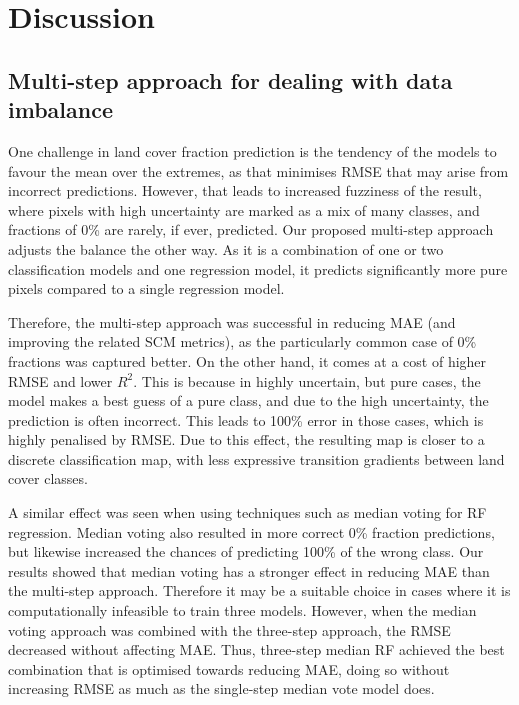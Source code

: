 \documentclass[review,authoryear,3p]{elsarticle}
\begin{document}
\section{Discussion}

\subsection{Multi-step approach for dealing with data imbalance}

One challenge in land cover fraction prediction is the tendency of the models to favour the mean over the extremes, as that minimises \gls{RMSE} that may arise from incorrect predictions.
However, that leads to increased fuzziness of the result, where pixels with high uncertainty are marked as a mix of many classes, and fractions of 0\% are rarely, if ever, predicted.
Our proposed multi-step approach adjusts the balance the other way.
As it is a combination of one or two classification models and one regression model, it predicts significantly more pure pixels compared to a single regression model.

Therefore, the multi-step approach was successful in reducing \gls{MAE} (and improving the related \gls{SCM} metrics), as the particularly common case of 0\% fractions was captured better.
On the other hand, it comes at a cost of higher \gls{RMSE} and lower $R^2$.
This is because in highly uncertain, but pure cases, the model makes a best guess of a pure class, and due to the high uncertainty, the prediction is often incorrect.
This leads to 100\% error in those cases, which is highly penalised by \gls{RMSE}.
Due to this effect, the resulting map is closer to a discrete classification map, with less expressive transition gradients between land cover classes.

A similar effect was seen when using techniques such as median voting for \gls{RF} regression.
Median voting also resulted in more correct 0\% fraction predictions, but likewise increased the chances of predicting 100\% of the wrong class.
Our results showed that median voting has a stronger effect in reducing \gls{MAE} than the multi-step approach.
Therefore it may be a suitable choice in cases where it is computationally infeasible to train three models.
However, when the median voting approach was combined with the three-step approach, the \gls{RMSE} decreased without affecting \gls{MAE}.
Thus, three-step median \gls{RF} achieved the best combination that is optimised towards reducing \gls{MAE}, doing so without increasing \gls{RMSE} as much as the single-step median vote model does.
\end{document}
